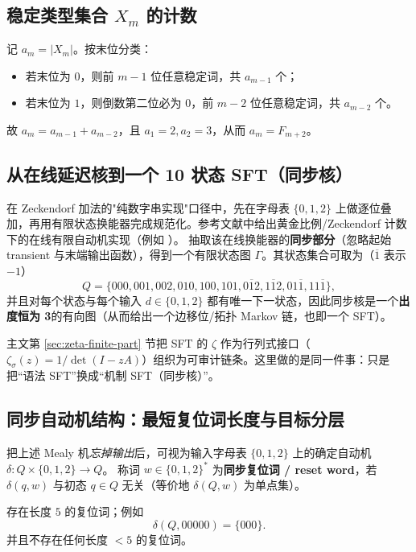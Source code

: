 \subsection{稳定类型集合 \texorpdfstring{$X_m$}{X\_m} 的计数}
记 $a_m=|X_m|$。按末位分类：
\begin{itemize}
  \item 若末位为 $0$，则前 $m-1$ 位任意稳定词，共 $a_{m-1}$ 个；
  \item 若末位为 $1$，则倒数第二位必为 $0$，前 $m-2$ 位任意稳定词，共 $a_{m-2}$ 个。
\end{itemize}
故 $a_m=a_{m-1}+a_{m-2}$，且 $a_1=2,a_2=3$，从而 $a_m=F_{m+2}$。

\subsection{从在线延迟核到一个 10 状态 SFT（同步核）}
在 Zeckendorf 加法的"纯数字串实现"口径中，先在字母表 $\{0,1,2\}$ 上做逐位叠加，再用有限状态换能器完成规范化。参考文献中给出黄金比例/Zeckendorf 计数下的在线有限自动机实现（例如 \cite{Frougny1999OnlineAddition}）。
抽取该在线换能器的\textbf{同步部分}（忽略起始 transient 与末端输出函数），得到一个有限状态图 $\Gamma$。其状态集合可取为（$\overline{1}$ 表示 $-1$）
\[
Q=\{000,001,002,010,100,101,0\overline{1}2,1\overline{1}2,01\overline{1},11\overline{1}\},
\]
并且对每个状态与每个输入 $d\in\{0,1,2\}$ 都有唯一下一状态，因此同步核是一个\textbf{出度恒为 3}的有向图（从而给出一个边移位/拓扑 Markov 链，也即一个 SFT）。



\begin{remark}
主文第 \ref{sec:zeta-finite-part} 节把 SFT 的 \(\zeta\) 作为行列式接口（\(\zeta_\sigma(z)=1/\det(I-zA)\)）组织为可审计链条。这里做的是同一件事：只是把“语法 SFT”换成“机制 SFT（同步核）”。
\end{remark}

\subsection{同步自动机结构：最短复位词长度与目标分层}\label{app:sync-kernel-reset-automaton}
把上述 Mealy 机\emph{忘掉输出}后，可视为输入字母表 $\{0,1,2\}$ 上的确定自动机
\(
\delta:Q\times\{0,1,2\}\to Q
\)。
称词 $w\in\{0,1,2\}^\ast$ 为\textbf{同步复位词 / reset word}，若 $\delta(q,w)$ 与初态 $q\in Q$ 无关（等价地 $\delta(Q,w)$ 为单点集）。

\begin{proposition}[10 态同步核的最短同步长度恰为 $5$]\label{prop:sync10-reset-length-5}
存在长度 $5$ 的复位词；例如
\[
\delta(Q,00000)=\{000\}.
\]
并且不存在任何长度 $<5$ 的复位词。
\end{proposition}

